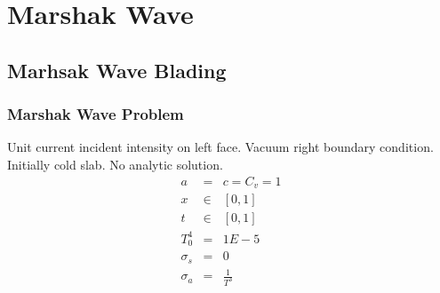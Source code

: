 \documentclass{beamer}
\newcommand{\bea}{\begin{eqnarray*}}  %
\newcommand{\eea}{\end{eqnarray*}}
\begin{document}
\section{Marshak Wave}
\subsection{Marhsak Wave Blading}
\begin{frame}
\frametitle{Marshak Wave Problem}
Unit current incident intensity on left face.  Vacuum right boundary condition.  Initially cold slab.  No analytic solution.
\bea
a&=&c=C_v = 1 \\
x&\in&[0,1] \\
t&\in&[0,1]  \\
T_0^4& =& 1E-5 \\
\sigma_s &=& 0 \\
\sigma_a &=& \frac{1}{T^3}
\eea
\end{frame}
\end{document}
